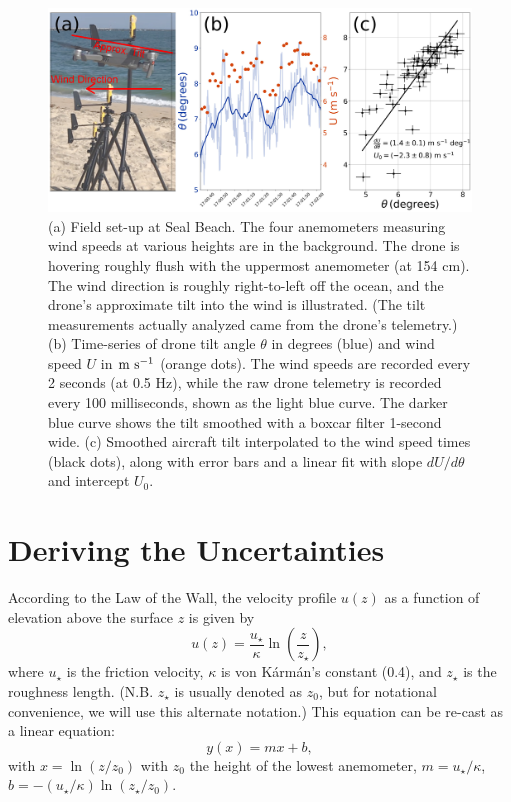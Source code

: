 \documentclass[linenumbers]{aastex631}
\begin{document}
\begin{figure}
    \centering
    \includegraphics[width=\textwidth]{figures and data/example_tilt_and_windspeed.jpg}
    \caption{(a) Field set-up at Seal Beach. The four anemometers measuring wind speeds at various heights are in the background. The drone is hovering roughly flush with the uppermost anemometer (at 154 cm). The wind direction is roughly right-to-left off the ocean, and the drone's approximate tilt into the wind is illustrated. (The tilt measurements actually analyzed came from the drone's telemetry.) (b) Time-series of drone tilt angle $\theta$ in degrees (blue) and wind speed $U$ in ${\rm m\ s^{-1}}$ (orange dots). The wind speeds are recorded every 2 seconds (at 0.5 Hz), while the raw drone telemetry is recorded every 100 milliseconds, shown as the light blue curve. The darker blue curve shows the tilt smoothed with a boxcar filter 1-second wide. (c) Smoothed aircraft tilt interpolated to the wind speed times (black dots), along with error bars and a linear fit with slope $dU/d\theta$ and intercept $U_0$.}
    \label{fig:example_tilt_and_windspeed}
\end{figure}

\appendix
\section{Deriving the Uncertainties}

According to the Law of the Wall, the velocity profile $u(z)$ as a function of elevation above the surface $z$ is given by
\begin{equation}
    u(z) = \frac{u_\star}{\kappa} \ln \left( \frac{z}{z_\star} \right),\label{eqn:uz_profile}
\end{equation}
where $u_\star$ is the friction velocity, $\kappa$ is von K\'{a}rm\'{a}n's constant (0.4), and $z_\star$ is the roughness length. (N.B. $z_\star$ is usually denoted as $z_0$, but for notational convenience, we will use this alternate notation.) This equation can be re-cast as a linear equation:
\begin{equation}
    y(x) = m x + b,\label{eqn:linear_eqn}
\end{equation}
with $x = \ln \left( z/z_0 \right)$ with $z_0$ the height of the lowest anemometer, $m = u_\star/\kappa$, $b = -\left(u_\star/\kappa\right) \ln\left( z_\star/z_0 \right)$.
\end{document}
